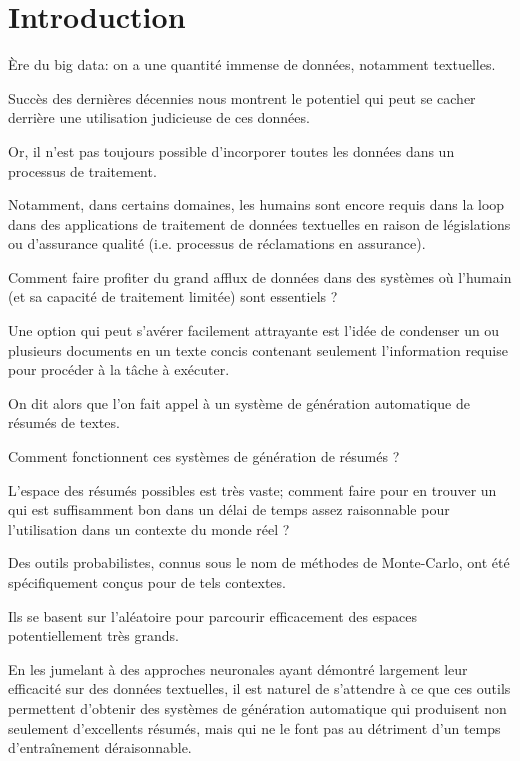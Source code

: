 \chapter*{Introduction}
\label{chap:introduction}       %


Ère du big data: on a une quantité immense de données, notamment textuelles.

Succès des dernières décennies nous montrent le potentiel qui peut se cacher
derrière une utilisation judicieuse de ces données.

Or, il n'est pas toujours possible d'incorporer toutes les données dans 
un processus de traitement.

Notamment, dans certains domaines, les humains sont encore requis dans la loop 
dans des applications de traitement de données textuelles en raison de 
législations ou d'assurance qualité (i.e. processus de réclamations en assurance).

Comment faire profiter du grand afflux de données dans des systèmes où l'humain (et 
sa capacité de traitement limitée) sont essentiels ?

Une option qui peut s'avérer facilement attrayante est l'idée de condenser un ou plusieurs
documents en un texte concis contenant seulement l'information requise pour procéder à la 
tâche à exécuter.

On dit alors que l'on fait appel à un système de génération automatique de résumés de textes.

Comment fonctionnent ces systèmes de génération de résumés ?

L'espace des résumés possibles est très vaste; comment faire pour en trouver un qui est
suffisamment bon dans un délai de temps assez raisonnable pour l'utilisation dans un contexte
du monde réel ?

Des outils probabilistes, connus sous le nom de méthodes de Monte-Carlo, ont été
spécifiquement conçus pour de tels contextes.

Ils se basent sur l'aléatoire pour parcourir efficacement des espaces potentiellement
très grands.

En les jumelant à des approches neuronales ayant démontré largement leur efficacité sur des données
textuelles, il est naturel de s'attendre à ce que ces outils permettent d'obtenir des 
systèmes de génération automatique qui produisent non seulement d'excellents résumés, mais qui
ne le font pas au détriment d'un temps d'entraînement déraisonnable.

